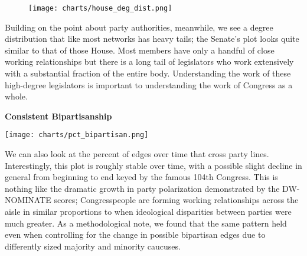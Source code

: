 \begin{figure}[htbp]
  \centering
  \texttt{[image: charts/house\_deg\_dist.png]}
\end{figure}

Building on the point about party authorities, meanwhile, we see a degree
distribution that like most networks has heavy tails; the Senate's plot looks
quite similar to that of those House. Most members have only a handful of close
working relationships but there is a long tail of legislators who work
extensively with a substantial fraction of the entire body. Understanding the
work of these high-degree legislators is important to understanding the work of
Congress as a whole.

\vspace{3mm}

\noindent
\textbf{Consistent Bipartisanship}

\vspace{3mm}

\texttt{[image: charts/pct\_bipartisan.png]}

We can also look at the percent of edges over time that cross party lines.
Interestingly, this plot is roughly stable over time, with a possible slight
decline in general from beginning to end keyed by the famous 104th Congress.
This is nothing like the dramatic growth in party polarization demonstrated by
the DW-NOMINATE scores; Congresspeople are forming working relationships across
the aisle in similar proportions to when ideological disparities between parties
were much greater. As a methodological note, we found that the same pattern held
even when controlling for the change in possible bipartisan edges due to
differently sized majority and minority caucuses.
